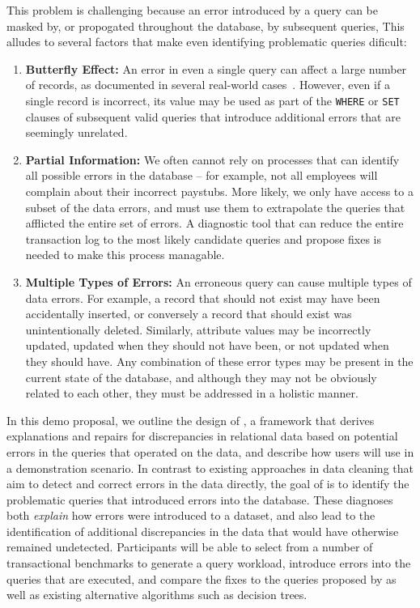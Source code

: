 This problem is challenging because an error introduced by a query can be masked by, or propogated throughout the database,
by subsequent queries, This alludes to several factors that make even identifying problematic queries dificult:

\begin{enumerate}[leftmargin=*, topsep=0mm, itemsep=0mm]

  \item {\bf Butterfly Effect: } 
  An error in even a single query can affect a large number of records, as documented in several real-world
  cases~\cite{Yates10, Grady13, sakalerrors}.  However, even if a single record is incorrect,
  its value may be used as part of the \texttt{WHERE} or \texttt{SET} clauses of 
  subsequent valid queries that introduce additional errors that are seemingly unrelated.

  \item {\bf Partial Information:}  We often cannot rely on processes that can identify all possible
  errors in the database -- for example, not all employees will complain about their incorrect paystubs.  
  More likely, we only have access to a subset of the data errors, and must use them to extrapolate 
  the queries that afflicted the entire set of errors.  A diagnostic tool that can reduce
  the entire transaction log to the most likely candidate queries and propose fixes
  is needed to make this process managable.


  \item {\bf Multiple Types of Errors:} 
  An erroneous query can cause multiple types of data errors.  For example, a record that should not exist may have been accidentally inserted, or conversely a record that 
  should exist was unintentionally deleted.  Similarly, attribute values may be incorrectly updated,
  updated when they should not have been, or not updated when they should have.  
  Any combination of these error types may be present in the current state of the database,
  and although they may not be obviously related to each other, they must be addressed in a holistic manner.  

\end{enumerate}


In this demo proposal, we outline the design of \sys, a framework that derives explanations
and repairs for discrepancies in relational data based on potential errors in
the queries that operated on the data, and describe how users will use \sys
in a demonstration scenario. 
In contrast to existing approaches in data
cleaning that aim to detect and correct errors in the data directly, the goal
of \sys is to identify  the problematic queries that introduced errors into the
database. These diagnoses both \emph{explain} how errors were introduced to a
dataset, and also lead to the identification of additional discrepancies in
the data that would have otherwise remained undetected.
Participants will be able to 
select from a number of transactional benchmarks to generate a query workload,
introduce errors into the queries that are executed,
and compare the fixes to the queries proposed by \sys as well as existing alternative algorithms such as decision trees.



